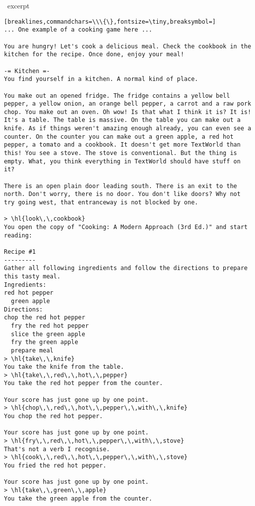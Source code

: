 \begin{AIbox}[width=0.9\textwidth]{\DV\ excerpt}
\begin{Verbatim}[breaklines,commandchars=\\\{\},fontsize=\tiny,breaksymbol=]
... One example of a cooking game here ...

You are hungry! Let's cook a delicious meal. Check the cookbook in the kitchen for the recipe. Once done, enjoy your meal!

-= Kitchen =-
You find yourself in a kitchen. A normal kind of place.

You make out an opened fridge. The fridge contains a yellow bell pepper, a yellow onion, an orange bell pepper, a carrot and a raw pork chop. You make out an oven. Oh wow! Is that what I think it is? It is! It's a table. The table is massive. On the table you can make out a knife. As if things weren't amazing enough already, you can even see a counter. On the counter you can make out a green apple, a red hot pepper, a tomato and a cookbook. It doesn't get more TextWorld than this! You see a stove. The stove is conventional. But the thing is empty. What, you think everything in TextWorld should have stuff on it?

There is an open plain door leading south. There is an exit to the north. Don't worry, there is no door. You don't like doors? Why not try going west, that entranceway is not blocked by one.

> \hl{look\,\,cookbook}
You open the copy of "Cooking: A Modern Approach (3rd Ed.)" and start reading:

Recipe #1
---------
Gather all following ingredients and follow the directions to prepare this tasty meal.
Ingredients:
red hot pepper
  green apple
Directions:
chop the red hot pepper
  fry the red hot pepper
  slice the green apple
  fry the green apple
  prepare meal
> \hl{take\,\,knife}
You take the knife from the table.
> \hl{take\,\,red\,\,hot\,\,pepper}
You take the red hot pepper from the counter.

Your score has just gone up by one point.
> \hl{chop\,\,red\,\,hot\,\,pepper\,\,with\,\,knife}
You chop the red hot pepper.

Your score has just gone up by one point.
> \hl{fry\,\,red\,\,hot\,\,pepper\,\,with\,\,stove}
That's not a verb I recognise.
> \hl{cook\,\,red\,\,hot\,\,pepper\,\,with\,\,stove}
You fried the red hot pepper.

Your score has just gone up by one point.
> \hl{take\,\,green\,\,apple}
You take the green apple from the counter.


\end{Verbatim}
\end{AIbox}
